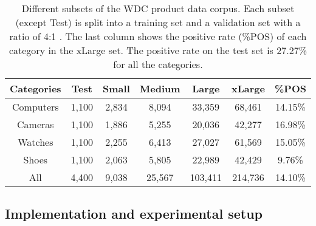 \setlength{\tabcolsep}{4.5pt}
\begin{table}[!ht]
\vspace{-3mm}
\small
\centering
\caption{\small Different subsets of the WDC product data corpus. Each subset (except Test) 
is split into a training set and a validation set with a ratio of \textsf{4:1}
. 
The last column shows the positive rate (\%POS) of each category in the xLarge set.
The positive rate on the test set is 27.27\% for all the categories.} \label{tab:wdc-dataset}
\vspace{-3mm}
\begin{tabular}{ccccccc}\toprule
\textbf{Categories} & \textbf{Test} & \textbf{Small}   & \textbf{Medium}  & \textbf{Large}   & \textbf{xLarge}  & \textbf{\%POS} \\ \midrule
Computers & 1,100 & 2,834 & 8,094  & 33,359  & 68,461  & 14.15\% \\
Cameras   & 1,100 & 1,886 & 5,255  & 20,036  & 42,277  & 16.98\% \\
Watches   & 1,100 & 2,255 & 6,413  & 27,027  & 61,569  & 15.05\% \\
Shoes     & 1,100 & 2,063 & 5,805  & 22,989  & 42,429  & 9.76\%  \\
All       & 4,400 & 9,038 & 25,567 & 103,411 & 214,736 & 14.10\% \\ \bottomrule
\end{tabular}
\vspace{-3mm}
\end{table}


\subsection{Implementation and experimental setup}\label{sec:setup}

